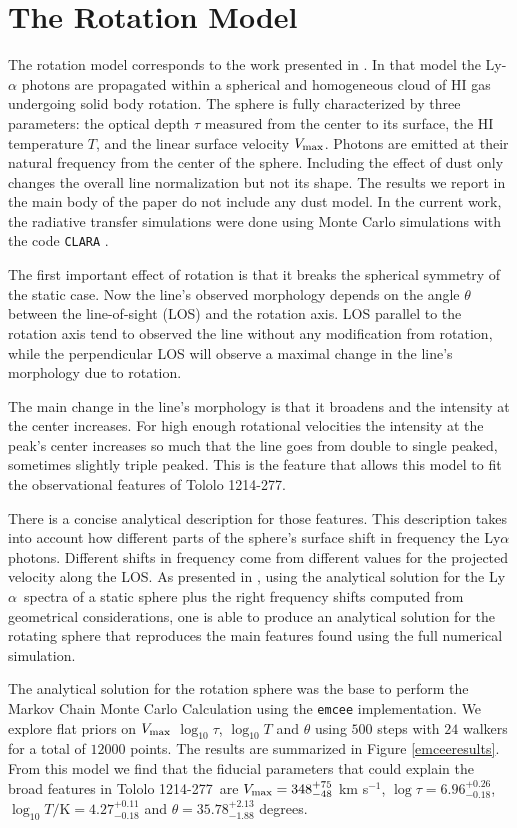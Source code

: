 \documentclass[a4paper, usenatbib, 12pt]{article}
\newcommand{\tol}{Tololo 1214-277}
\newcommand{\lya}{Ly$\alpha$}
\begin{document}
{\section*{The Rotation Model}

The rotation model corresponds to the work presented in
\cite{GaravitoCamargo2014}. 
In that model the Ly-$\alpha$ photons are propagated 
within a spherical and homogeneous cloud of HI gas undergoing solid
body rotation.
The sphere is fully characterized by three parameters: the optical
depth $\tau$ measured from the center to its surface, the HI
temperature $T$, and the linear surface velocity $V_{\rm max}$.  
Photons are emitted at their natural frequency from the center of the
sphere. 
Including the effect of dust only changes the overall line
normalization but not its shape.  
The results we report in the main body of the paper do not include any
dust model.
In the current work, the radiative transfer simulations were done
using Monte Carlo simulations with the code \texttt{CLARA}
\cite{CLARA}.  

The first important effect of rotation is that it breaks the spherical
symmetry of the static case. 
Now the line's observed morphology depends on the angle $\theta$ between the
line-of-sight (LOS) and the rotation axis. 
LOS parallel to the rotation axis tend to observed the line without
any modification from rotation, while the perpendicular LOS will
observe a maximal change in the line's morphology due to rotation.

The main change in the line's morphology is that it broadens and the
intensity at the center increases. 
For high enough rotational velocities the intensity at the peak's
center increases so much that the line goes from double to single
peaked, sometimes slightly triple peaked.
This is the feature that allows this model to fit the observational
features of \tol.

There is a concise analytical description for those features.
This description takes into account how different parts of the
sphere's surface shift in frequency the \lya photons. 
Different shifts in frequency come from different values for the projected
velocity along the LOS. 
As presented in \cite{CLARA}, using the analytical solution for the
\lya\ spectra of a static sphere plus the right frequency shifts
computed from geometrical considerations, one is able to produce an
analytical solution for the rotating sphere that reproduces the main
features found using the full numerical simulation.

The analytical solution for the rotation sphere was the base to
perform the Markov Chain Monte Carlo Calculation using the
\texttt{emcee} implementation.
We explore flat priors on $V_{\rm max}$ $\log_{10}\tau$, $\log_{10} T$ and
$\theta$ using $500$ steps with $24$ walkers for a total of $12000$
points.
The results are summarized in Figure \ref{emceeresults}. 
From this model we find that the fiducial parameters that could
explain the broad features in \tol\ are $V_{\rm max}=348^{+75}_{-48}$
km s$^{-1}$, $\log \tau = 6.96^{+0.26}_{-0.18}$, $\log_{10} T/\mathrm
{K} = 4.27^{+0.11}_{-0.18}$ and  $\theta = 35.78^{+2.13}_{-1.88}$ degrees.


}
\end{document}

